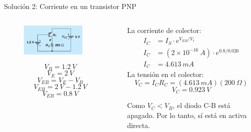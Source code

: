 \documentclass[t,aspectratio=169]{beamer}
\begin{document}
\begin{frame}{Solución 2: Corriente en un transistor PNP}

\begin{columns}
\begin{column}{0.5\textwidth}

\begin{figure}
    \centering
    \includegraphics[width=0.8\textwidth]{figures/ejemplo_2b.png}
\end{figure}
%
\[ V_B = 1.2\ V \]
%
\[ V_E = 2\ V \]
%
\[ V_{EB} = V_E - V_B \]
%
\[ V_{EB} = 2\ V - 1.2\ V \]
%
\[ V_{EB} = 0.8\ V \]

\end{column}
\begin{column}{0.5\textwidth}

La corriente de colector:
%
\begin{align*}
I_C &= I_S \cdot e^{V_{EB}/V_t} \\
I_C &= (2\times{}10^{-16}\ A) \cdot e^{0.8/0.026} \\
I_C &= 4.613\ mA
\end{align*}
%
La tensión en el colector:
%
\[ V_C = I_C R_C = (4.613\ mA)(200\ \Omega) \]
%
\[ V_C = 0.923\ V \]

Como $V_C < V_B$, el diodo C-B está apagado. Por lo tanto, sí está en activa directa.

\end{column}
\end{columns}
    
\end{frame}
\end{document}
